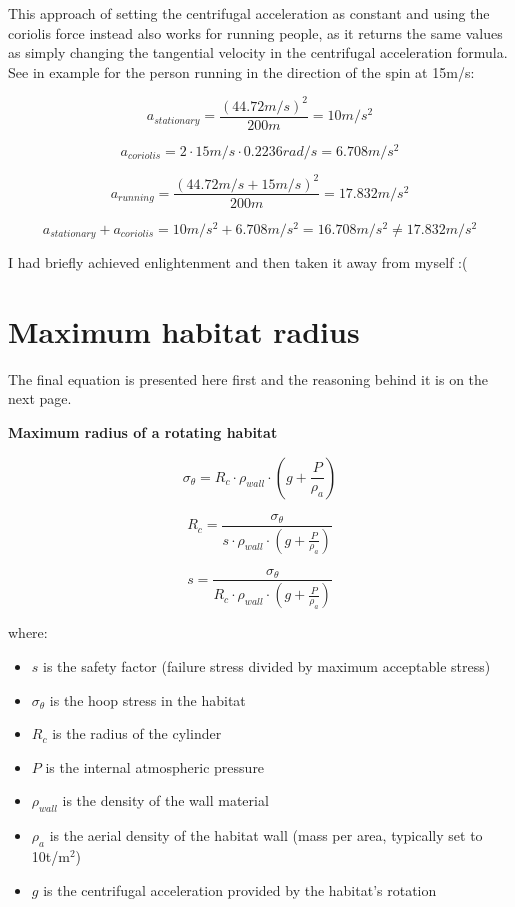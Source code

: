\documentclass[a4paper]{article}
\begin{document}
	This approach of setting the centrifugal acceleration as constant and using the coriolis force instead also works for running people, as it returns the same values as simply changing the tangential velocity in the centrifugal acceleration formula. See in example for the person running in the direction of the spin at 15m/s:
	
	$$ a_{stationary} = \frac{(44.72m/s)^2}{200m} = 10m/s^2 $$
	
	$$ a_{coriolis} = 2 \cdot 15m/s \cdot 0.2236rad/s = 6.708m/s^2 $$
	
	$$ a_{running} = \frac{(44.72m/s + 15m/s)^2}{200m} = 17.832m/s^2 $$
	
	$$ a_{stationary} + a_{coriolis} = 10m/s^2 + 6.708m/s^2 = 16.708m/s^2 \neq 17.832m/s^2 $$
	
	I had briefly achieved enlightenment and then taken it away from myself :(
	
	\fi
	
	\pagebreak
	
	\section{Maximum habitat radius}
	
	The final equation is presented here first and the reasoning behind it is on the next page.
	
	\begin{center}
		\textbf{Maximum radius of a rotating habitat}
	\end{center}
	
	$$ \sigma_\theta = R_c \cdot \rho_{wall} \cdot (g + \frac{P}{\rho_a})$$
	
	$$ R_c = \frac{\sigma_\theta}{s \cdot \rho_{wall} \cdot (g + \frac{P}{\rho_a})}$$
	
	$$ s = \frac{\sigma_\theta}{R_c \cdot \rho_{wall} \cdot (g + \frac{P}{\rho_a})}$$
	
	where:
	
	\begin{itemize}
		\item $s$ is the safety factor (failure stress divided by maximum acceptable stress)
		
		\item $\sigma_\theta$ is the hoop stress in the habitat
		
		\item $R_c$ is the radius of the cylinder
		
		\item $P$ is the internal atmospheric pressure
		
		\item $\rho_{wall}$ is the density of the wall material
		
		\item $\rho_a$ is the aerial density of the habitat wall (mass per area, typically set to 10t/m$^2$)
		
		\item $g$ is the centrifugal acceleration provided by the habitat's rotation
	\end{itemize}
	
\end{document}
